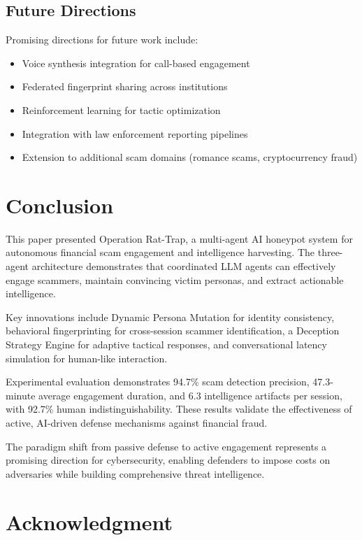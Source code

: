 \documentclass[conference]{IEEEtran}
\begin{document}
\subsection{Future Directions}

Promising directions for future work include:
\begin{itemize}
    \item Voice synthesis integration for call-based engagement
    \item Federated fingerprint sharing across institutions
    \item Reinforcement learning for tactic optimization
    \item Integration with law enforcement reporting pipelines
    \item Extension to additional scam domains (romance scams, cryptocurrency fraud)
\end{itemize}

\section{Conclusion}

This paper presented Operation Rat-Trap, a multi-agent AI honeypot system for autonomous financial scam engagement and intelligence harvesting. The three-agent architecture demonstrates that coordinated LLM agents can effectively engage scammers, maintain convincing victim personas, and extract actionable intelligence.

Key innovations include Dynamic Persona Mutation for identity consistency, behavioral fingerprinting for cross-session scammer identification, a Deception Strategy Engine for adaptive tactical responses, and conversational latency simulation for human-like interaction.

Experimental evaluation demonstrates 94.7\% scam detection precision, 47.3-minute average engagement duration, and 6.3 intelligence artifacts per session, with 92.7\% human indistinguishability. These results validate the effectiveness of active, AI-driven defense mechanisms against financial fraud.

The paradigm shift from passive defense to active engagement represents a promising direction for cybersecurity, enabling defenders to impose costs on adversaries while building comprehensive threat intelligence.

\section*{Acknowledgment}
\end{document}
